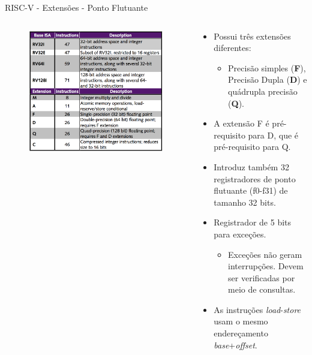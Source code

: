 \documentclass[aspectratio=169]{beamer}
\begin{document}
\begin{frame}{RISC-V - Extensões - Ponto Flutuante}
	\begin{columns}
		\begin{column}{0.58\textwidth}
			\begin{figure}
				\centering
				\label{fig:bi2}
				\includegraphics[width=1\textwidth]{img/base-instruction.png}
			\end{figure}
		\end{column}
		\begin{column}{0.55\textwidth}

			\begin{itemize}
				\item Possui três extensões diferentes:
				\begin{itemize}
					\item Precisão simples (\textbf{F}), Precisão Dupla (\textbf{D}) e quádrupla precisão (\textbf{Q}).
				\end{itemize}
				\item A extensão F é pré-requisito para D, que é pré-requisito para Q.
				\item Introduz também 32 registradores de ponto flutuante (f0-f31) de tamanho 32 bits.
				\item Registrador de 5 bits para exceções.
				\begin{itemize}
					\item Exceções não geram interrupções. Devem ser verificadas por meio de consultas.
				\end{itemize}
				\item As instruções \textit{load}-\textit{store} usam o mesmo endereçamento \textit{base}+\textit{offset}.
			\end{itemize}
		\end{column}
	\end{columns}
\end{frame}
\end{document}
